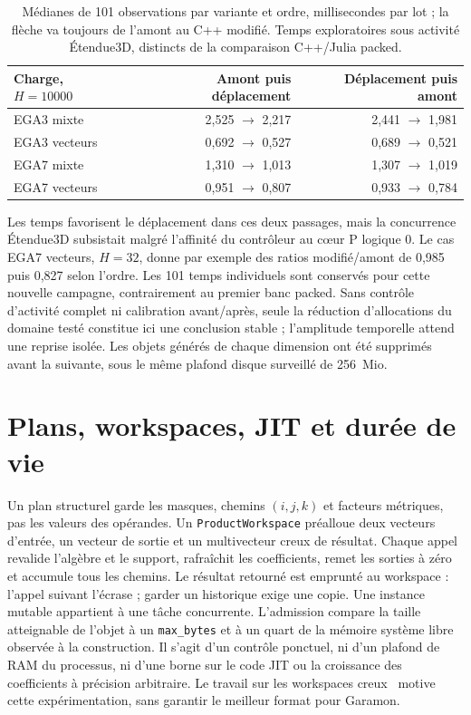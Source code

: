 \documentclass[11pt,a4paper]{article}
\newcommand{\code}[1]{\texttt{#1}}
\begin{document}
\begin{table}[ht]
\centering\small
\begin{tabular}{@{}lrr@{}}
\toprule
Charge, $H=10000$ & Amont puis déplacement & Déplacement puis amont \\
\midrule
EGA3 mixte & 2,525 $\to$ 2,217 & 2,441 $\to$ 1,981 \\
EGA3 vecteurs & 0,692 $\to$ 0,527 & 0,689 $\to$ 0,521 \\
EGA7 mixte & 1,310 $\to$ 1,013 & 1,307 $\to$ 1,019 \\
EGA7 vecteurs & 0,951 $\to$ 0,807 & 0,933 $\to$ 0,784 \\
\bottomrule
\end{tabular}
\caption{Médianes de 101 observations par variante et ordre, millisecondes
par lot ; la flèche va toujours de l'amont au C++ modifié. Temps
exploratoires sous activité Étendue3D, distincts de la comparaison
C++/Julia packed.}
\label{tab:cppmovetimes}
\end{table}

Les temps favorisent le déplacement dans ces deux passages, mais la
concurrence Étendue3D subsistait malgré l'affinité du contrôleur au
cœur P logique 0. Le cas EGA7 vecteurs, $H=32$, donne par exemple des
ratios modifié/amont de 0,985 puis 0,827 selon l'ordre. Les 101 temps
individuels sont conservés pour cette nouvelle campagne, contrairement au
premier banc packed. Sans contrôle d'activité complet ni calibration
avant/après, seule la réduction d'allocations du domaine testé constitue
ici une conclusion stable ; l'amplitude temporelle attend une reprise
isolée. Les objets générés de chaque dimension ont été supprimés avant la
suivante, sous le même plafond disque surveillé de 256~Mio.
\FloatBarrier

\section{Plans, workspaces, JIT et durée de vie}
Un plan structurel garde les masques, chemins $(i,j,k)$ et facteurs métriques,
pas les valeurs des opérandes. Un \code{ProductWorkspace} préalloue deux vecteurs
d'entrée, un vecteur de sortie et un multivecteur creux de résultat. Chaque
appel revalide l'algèbre et le support, rafraîchit les coefficients, remet les
sorties à zéro et accumule tous les chemins. Le résultat retourné est emprunté
au workspace : l'appel suivant l'écrase ; garder un historique exige une copie.
Une instance mutable appartient à une tâche concurrente. L'admission compare
la taille atteignable de l'objet à un \code{max\_bytes} et à un quart de la
mémoire système libre observée à la construction. Il s'agit d'un contrôle
ponctuel, ni d'un plafond de RAM du processus, ni d'une borne sur le code JIT
ou la croissance des coefficients à précision arbitraire. Le travail sur les
workspaces creux~\cite{sparseworkspace} motive cette expérimentation, sans
garantir le meilleur format pour Garamon.
\end{document}

